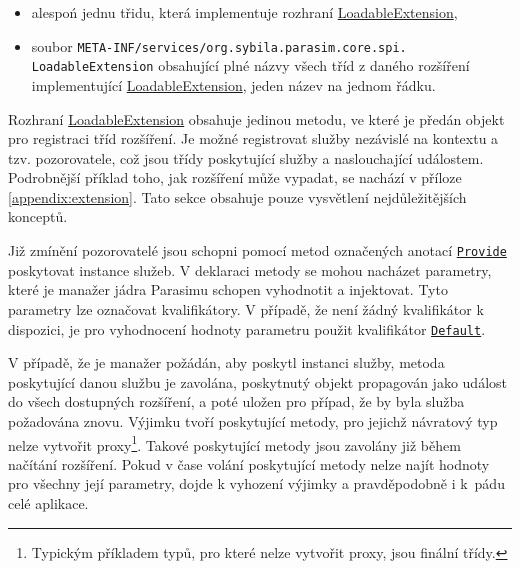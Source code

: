 \begin{itemize}
	\item	alespoń jednu třidu, která implementuje rozhraní \href{https://github.com/sybila/parasim/blob/2.0.0.Final/core/src/main/java/org/sybila/parasim/core/spi/LoadableExtension.java}{LoadableExtension},
	\item	soubor \texttt{META-INF/services/org.sybila.parasim.core.spi.\\LoadableExtension} obsahující plné názvy všech tříd z daného roz\-ší\-ření implementující \href{https://github.com/sybila/parasim/blob/2.0.0.Final/core/src/main/java/org/sybila/parasim/core/spi/LoadableExtension.java}{LoadableExtension}, jeden název na jednom řád\-ku. 
\end{itemize}

Rozhraní \href{https://github.com/sybila/parasim/blob/2.0.0.Final/core/src/main/java/org/sybila/parasim/core/spi/LoadableExtension.java}{LoadableExtension}
obsahuje jedinou metodu, ve které je pře\-dán objekt pro registraci tříd rozšíření. Je možné
registrovat služby ne\-zá\-vi\-slé na kontextu a tzv. pozorovatele, což jsou třídy poskytující
služby a naslouchající událostem. Podrobnější příklad toho, jak rozšíření může vypadat,
se nachází v příloze \ref{appendix:extension}. Tato sekce obsahuje pouze vysvětlení
nej\-dů\-le\-ži\-těj\-ších konceptů.

Již zmínění pozorovatelé jsou schopni pomocí metod označených anotací \href{https://github.com/sybila/parasim/blob/2.0.0.Final/core/src/main/java/org/sybila/parasim/core/annotation/Provide.java}{\texttt{Provide}}
poskytovat instance služeb. V deklaraci metody se mohou na\-chá\-zet parametry,
které je manažer jádra Parasimu schopen vyhodnotit a injektovat. Tyto parametry
lze označovat kvalifikátory. V případě, že není žádný kvalifikátor k dispozici,
je pro vyhodnocení hodnoty parametru použit kvalifikátor \href{https://github.com/sybila/parasim/blob/2.0.0.Final/core/src/main/java/org/sybila/parasim/core/annotation/Default.java}{\texttt{Default}}.

V případě, že je manažer požádán, aby poskytl instanci služby, metoda poskytující danou službu je zavolána,
poskytnutý objekt propagován jako událost do všech dostupných rozšíření, a poté uložen pro případ,
že by byla služba požadována znovu. Výjimku tvoří poskytující metody, pro jejichž
návratový typ nelze vytvořit proxy\footnote{Typickým příkladem typů, pro které nelze vytvořit proxy, jsou finální třídy.}.
Takové poskytující metody jsou zavolány již během načítání rozšíření. Pokud v čase volání
poskytující metody nelze najít hodnoty pro všechny její parametry, dojde k vyhození výjimky a
pravděpodobně i k~pádu celé aplikace.

